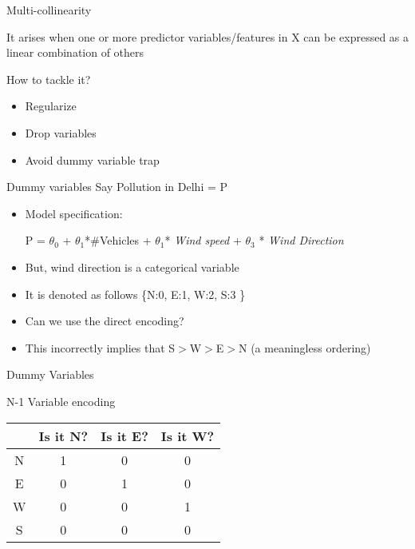 \documentclass{beamer}
\begin{document}
    \begin{frame}{Multi-collinearity}
    
    It arises when one or more predictor variables/features in X can be expressed as a linear combination of others\\
    \vspace{5mm}
    
    
    
    How to tackle it?
    \begin{itemize}
        \item<+-> Regularize
        \item<+-> Drop variables
        \item<+-> Avoid dummy variable trap
    \end{itemize}
    \end{frame}
    \begin{frame}{Dummy variables}
    Say Pollution in Delhi = P
    \begin{itemize}[<+->]
        \item Model specification:
            \begin{center}
            P = $\theta_{0}$ + $\theta_{1}$*\#Vehicles + $\theta_{1}$*
            \textit{Wind speed} + $\theta_{3}$ * \textit{Wind Direction}
            \end{center}
        \item But, wind direction is a categorical variable
        \item It is denoted as follows \{N:0, E:1, W:2, S:3 \}
        \item Can we use the direct encoding?
        \item This incorrectly implies that S$>$W$>$E$>$N (a meaningless ordering)
    \end{itemize}
    \end{frame}
    
    \begin{frame}{Dummy Variables}
    \begin{center}
    
    N-1 Variable encoding\\
    \vspace{1em}
    \begin{tabular}{|c|c|c|c|}
        \hline
        & Is it N? &Is it E? &Is it W?\\
        \hline
        \hline
        N & 1&0&0 \\
        E & 0&1&0\\
        W & 0&0&1\\
        S & 0&0&0\\
        \hline
    \end{tabular}
    
    \end{center}
    \end{frame}
    
\end{document}
